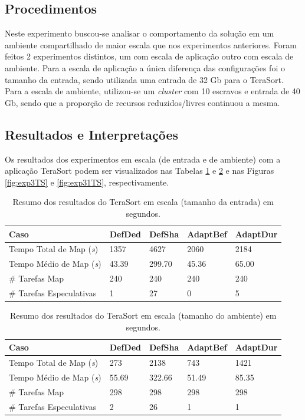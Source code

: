\subsection{Procedimentos}
Neste experimento buscou-se analisar o comportamento da solução em um ambiente compartilhado de maior escala que nos experimentos anteriores. Foram feitos 2 experimentos distintos, um com escala de aplicação outro com escala de ambiente. Para a escala de aplicação a única diferença das configurações foi o tamanho da entrada, sendo utilizada uma entrada de 32 Gb para o TeraSort. Para a escala de ambiente, utilizou-se um \textit{cluster} com 10 escravos e entrada de 40 Gb, sendo que a proporção de recursos reduzidos/livres continuou a mesma. 

\subsection{Resultados e Interpretações}
Os resultados dos experimentos em escala (de entrada e de ambiente) com a aplicação TeraSort podem ser visualizados nas Tabelas \ref{tab:exp3TS} e \ref{tab:exp31TS} e nas Figuras \ref{fig:exp3TS} e \ref{fig:exp31TS}, respectivamente.

\begin{table}[!ht]
	\caption{Resumo dos resultados do TeraSort em escala (tamanho da entrada) em segundos.} \label{tab:exp3TS}
	\begin{tabular*}{\hsize}{l|llll}
		\textbf{Caso} & \textbf{DefDed} & \textbf{DefSha} & \textbf{AdaptBef} & \textbf{AdaptDur}\\
		\hline
		Tempo Total de Map ({\it{s}}) & 1357 & 4627 & 2060 & 2184 \\
		Tempo Médio de Map ({\it{s}}) & 43.39 & 299.70 & 45.36 & 65.00 \\
		\# Tarefas Map & 240 & 240 & 240 & 240 \\
		\# Tarefas Especulativas & 1 & 27 & 0 & 5 \\
	\end{tabular*}
\end{table}
%
%


\begin{table}[!ht]
	\caption{Resumo dos resultados do TeraSort em escala (tamanho do ambiente) em segundos.} \label{tab:exp31TS}
	\begin{tabular*}{\hsize}{l|llll}
		\textbf{Caso} & \textbf{DefDed} & \textbf{DefSha} & \textbf{AdaptBef} & \textbf{AdaptDur}\\
		\hline
		Tempo Total de Map ({\it{s}}) & 273 & 2138 & 743 & 1421 \\
		Tempo Médio de Map ({\it{s}}) & 55.69 & 322.66 & 51.49 & 85.35 \\
		\# Tarefas Map & 298 & 298 & 298 & 298 \\
		\# Tarefas Especulativas & 2 & 26 & 1 & 1 \\
	\end{tabular*}
\end{table}
%
%

